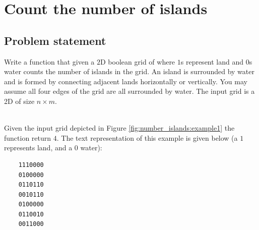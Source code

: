 %

\chapter{Count the number of islands}
\label{ch:number_islands}

\section{Problem statement}
\begin{exercise}
Write a function that given a $2$D boolean grid of where $1$s represent land and $0$s water counts the number of islands in the grid. An island is surrounded by water and is formed by connecting adjacent lands horizontally or vertically. You may assume all four edges of the grid are all surrounded by water.
The input grid is a 2D  of size $n\times m$. 

	\begin{example}
		\hfill \\
		Given the input grid depicted in Figure \ref{fig:number_islands:example1} the function return $4$.
	The text representation of this example is given below (a $1$ represents land, and a $0$ water):	
	\begin{verbatim}
	1110000
	0100000
	0110110
	0010110
	0100000
	0110010
	0011000
	\end{verbatim}
	\end{example}

\end{exercise}

